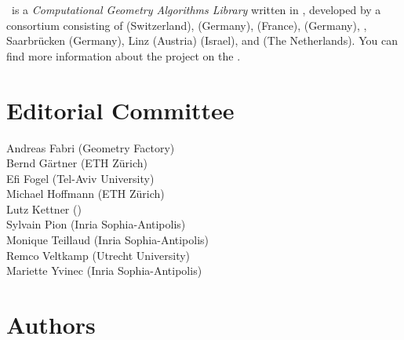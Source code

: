 

\cgal\ is a {\em Computational Geometry Algorithms Library} written in \CC, 
developed by a consortium consisting of
 (Switzerland), 
 (Germany), 
 (France),
 (Germany),
,
Saarbr\"ucken (Germany),
 Linz (Austria)
 (Israel), and
 (The Netherlands). 
You can find more information about the project on the 
.




\section*{Editorial Committee}

Andreas Fabri ({\sc Geometry Factory}) \\
Bernd G\"artner (ETH Z\"urich) \\
Efi Fogel (Tel-Aviv University) \\
Michael Hoffmann (ETH Z\"urich) \\
Lutz Kettner ()\\
Sylvain Pion ({\sc Inria} Sophia-Antipolis)\\
Monique Teillaud ({\sc Inria} Sophia-Antipolis)\\
Remco Veltkamp (Utrecht University)\\
Mariette Yvinec ({\sc Inria} Sophia-Antipolis)\\




\section*{Authors}


